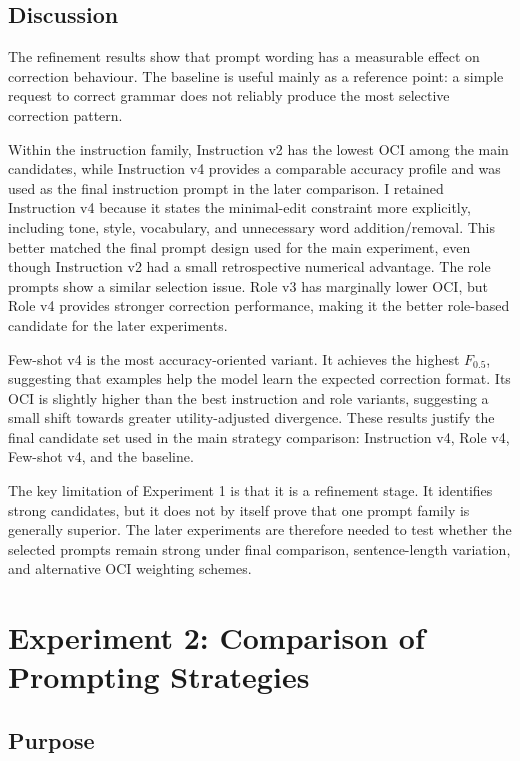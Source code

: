 \subsection{Discussion}

The refinement results show that prompt wording has a measurable effect on correction behaviour. The baseline is useful mainly as a reference point: a simple request to correct grammar does not reliably produce the most selective correction pattern.

Within the instruction family, Instruction v2 has the lowest OCI among the main candidates, while Instruction v4 provides a comparable accuracy profile and was used as the final instruction prompt in the later comparison. I retained Instruction v4 because it states the minimal-edit constraint more explicitly, including tone, style, vocabulary, and unnecessary word addition/removal. This better matched the final prompt design used for the main experiment, even though Instruction v2 had a small retrospective numerical advantage. The role prompts show a similar selection issue. Role v3 has marginally lower OCI, but Role v4 provides stronger correction performance, making it the better role-based candidate for the later experiments.

Few-shot v4 is the most accuracy-oriented variant. It achieves the highest $F_{0.5}$, suggesting that examples help the model learn the expected correction format. Its OCI is slightly higher than the best instruction and role variants, suggesting a small shift towards greater utility-adjusted divergence. These results justify the final candidate set used in the main strategy comparison: Instruction v4, Role v4, Few-shot v4, and the baseline.

The key limitation of Experiment 1 is that it is a refinement stage. It identifies strong candidates, but it does not by itself prove that one prompt family is generally superior. The later experiments are therefore needed to test whether the selected prompts remain strong under final comparison, sentence-length variation, and alternative OCI weighting schemes.

\section{Experiment 2: Comparison of Prompting Strategies}

\subsection{Purpose}

